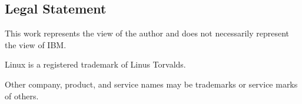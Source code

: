 \begin{center}
\end{center}

\subsection{Legal Statement}

This work represents the view of the author and does not necessarily
represent the view of IBM\@.

Linux is a registered trademark of Linus Torvalds.

Other company, product, and service names may be trademarks or service
marks of others.
